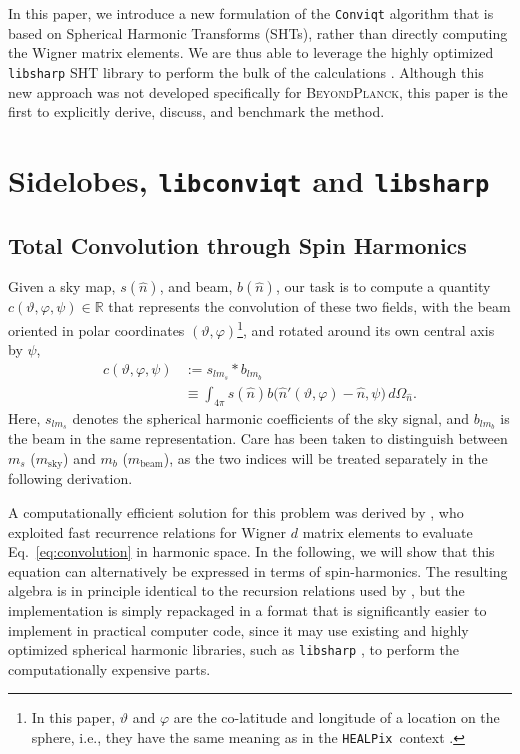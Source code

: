 \documentclass[twocolumn]{aa}
\def\healpix{\texttt{HEALPix}}
\newcommand{\BP}{\textsc{BeyondPlanck}}
\newcommand{\cvar}{\ensuremath{c(\vartheta, \varphi, \psi)}}
\begin{document}
In this paper, we introduce a new formulation of the \texttt{Conviqt} algorithm that is based on Spherical Harmonic Transforms (SHTs), rather than directly computing the Wigner matrix elements. We are thus able to leverage the highly optimized \texttt{libsharp} SHT library to perform the bulk of the calculations \citep{libsharp}. Although this new approach was not developed specifically for \BP, this paper is the first to explicitly derive, discuss, and benchmark the method.

\section{Sidelobes, \texttt{libconviqt} and \texttt{libsharp}}

\subsection{Total Convolution through Spin Harmonics}

\label{sec:conviqt}

Given a sky map, $s(\hat{n})$, and beam, $b(\hat{n})$, our task is to
compute a quantity $\cvar \in \mathbb{R}$ that represents the
convolution of these two fields, with the beam oriented in polar
coordinates $(\vartheta, \varphi)$\footnote{In this paper, $\vartheta$ and $\varphi$ are the co-latitude and longitude of a location on the sphere, i.e., they have the same meaning as in the \healpix\ context \citep{gorski2005}.}, and rotated around its own central
axis by $\psi$,
\begin{equation}
\begin{aligned}
  \cvar &:= s_{lm_s} * b_{lm_b}\\ 
   &\equiv \int_{4\pi} s(\hat{n})
  b\big(\hat{n}'(\vartheta,\varphi)-\hat{n},\psi\big)\, d\Omega_{\hat{n}}.
  \label{eq:convolution}
\end{aligned}
\end{equation}
Here, $s_{lm_s}$ denotes the spherical harmonic coefficients of the sky signal, and $b_{lm_b}$ is the beam in the same representation. Care has been taken to distinguish between $m_s$ ($m_\text{sky}$) and $m_b$ ($m_\text{beam}$), as the two indices will be treated separately in the following derivation.

A computationally efficient solution for this problem was derived by
\citet{conviqt}, who exploited fast recurrence relations for Wigner
$d$ matrix elements to evaluate Eq.~\eqref{eq:convolution} in harmonic
space. In the following, we will show that this equation
can alternatively be expressed in terms of spin-harmonics. The
resulting algebra is in principle identical to the recursion relations
used by \citet{conviqt}, but the implementation is simply repackaged
in a format that is significantly easier to implement in practical
computer code, since it may use existing and highly optimized
spherical harmonic libraries, such as \texttt{libsharp} \citep{libsharp}, to perform
the computationally expensive parts.
\end{document}
